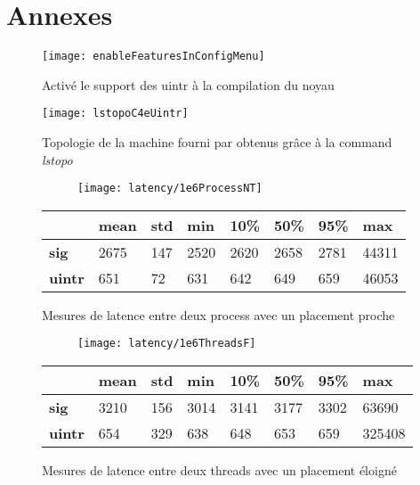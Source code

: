 \newpage

\section{Annexes}

\begin{figure}[H]
  \texttt{[image: enableFeaturesInConfigMenu]}
  \caption{Activé le support des uintr à la compilation du noyau}
  \label{fig:enableFeaturesInConfigMenu}
\end{figure}

\begin{figure}[H]
  \texttt{[image: lstopoC4eUintr]}
  \caption{Topologie de la machine fourni par \atos{} obtenus grâce à la command \emph{lstopo}}
  \label{fig:lstopo}
\end{figure}

\begin{figure}[H]
  \begin{subfigure}{\textwidth}
    \texttt{[image: latency/1e6ProcessNT]}
    \caption{}
    \label{subfig:latency1e6ProcessNT}
  \end{subfigure}
  \begin{subtable}{\textwidth}
    \centering
    \begin{tabular}{| l | l | l | l | l | l | l | l |}
      \hline
      &\bf mean &\bf std &\bf min  &\bf 10\% &\bf 50\% &\bf 95\% &\bf max\\
      \hline
      \bf sig   & 2675 & 147 & 2520 & 2620 & 2658 & 2781 & 44311\\
      \hline
      \bf uintr & 651  & 72  & 631  & 642  & 649  & 659  & 46053\\
      \hline
    \end{tabular}
    \caption{}
    \label{tab:latency1e6ProcessNT}
  \end{subtable}
  \caption{Mesures de latence entre deux process avec un placement proche}
  \label{fig:latency1e6ProcessNT}
\end{figure}

\begin{figure}[H]
  \begin{subfigure}{\textwidth}
    \texttt{[image: latency/1e6ThreadsF]}
    \caption{}
    \label{subfig:latency1e6ThreadsF}
  \end{subfigure}
  \begin{subtable}{\textwidth}
    \centering
    \begin{tabular}{| l | l | l | l | l | l | l | l |}
      \hline
      &\bf mean &\bf std &\bf min  &\bf 10\% &\bf 50\% &\bf 95\% &\bf max\\
      \hline
      \bf sig   & 3210 & 156 & 3014 & 3141 & 3177 & 3302 & 63690\\
      \hline
      \bf uintr & 654  & 329 & 638  & 648  & 653  & 659  & 325408\\
      \hline
    \end{tabular}
    \caption{}
    \label{tab:latency1e6ThreadsF}
  \end{subtable}
  \caption{Mesures de latence entre deux threads avec un placement éloigné}
  \label{fig:latency1e6ThreadsF}
\end{figure}

